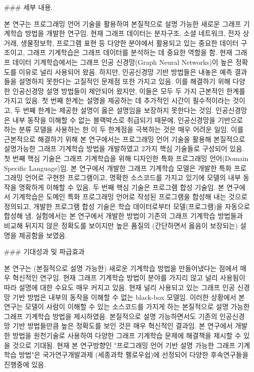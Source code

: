 



### 세부 내용.

본 연구는 프로그래밍 언어 기술을 활용하여 본질적으로 설명 가능한 새로운 그래프 기계학습 방법을 개발한 연구임. 
현재 그래프 데이터는 분자구조, 소셜 네트워크, 전자 상거래, 생물정보학, 
프로그램 표현 등 다양한 분야에서 활용되고 있는 중요한 데이터 구조이고, 그래프 기계학습은 그래프 데이터를 분석하는 데 중요한 역할을 함.
현재 그래프 데이터 기계학습에서는 그래프 인공 신경망(Graph Neural Networks)이 높은 정확도를 이유로 널리 사용되어 왔음. 
하지만, 인공신경망 기반 방법들은 내놓은 예측 결과들을 설명하지 못한다는 고질적인 문제점 또한 가지고 있음.
이를 해결하기 위해 다양한 인공신경망 설명 방법들이 제안되어 왔지만, 이들은 모두 두 가지 근본적인 한계를 가지고 있음.
첫 번째 한계는 설명을 제공하는 데 추가적인 시간이 필수적이라는 것이고, 두 번째 한계는 제공한 설명이 옳은 설명임을 보장하지 못한다는 것임. 
인공신경망은 내부 동작을 이해할 수 없는 블랙박스로 취급되기 때문에, 인공신경망을 기반으로 하는 분류 모델을 사용하는 한 이 두 한계점을 극복하는 것은 매우 어려운 일임.
이를 근본적으로 해결하기 위해 본 연구에서는 프로그래밍 언어 기술을 활용해 본질적으로 설명가능한 그래프 기계학습 방법을 개발하였고 2가지 핵심 기술들로 구성되어 있음.
첫 번째 핵심 기술은 그래프 기계학습을 위해 디자인한 특화 프로그래밍 언어(Domain Specific Language)임. 본 연구에서 개발한 그래프 기계학습 모델은 개발한 특화 프로그래밍 언어로 구현한 프로그램이고, 명확한 소스코드를 가지고 있기에 모델의 내부 동작을 명확하게 이해할 수 있음. 
두 번째 핵심 기술은 프로그램 합성 기술임.
본 연구에서 기계학습은 도메인 특화 프로그래밍 언어로 작성된 프로그램을 합성해 내는 것으로 정의되고, 개발한 프로그램 합성 기술은 학습 데이터로부터 모델(프로그램)을 자동으로 합성해 냄.
실험에서는 본 연구에서 개발한 방법이 기존의 그래프 기계학습 방법들과 비교해 뒤지지 않은 정확도를 보이지만 높은 품질의 (간단하면서 옳음이 보장되는) 설명을 제공함을 보였음.




### 기대성과 및 파급효과

본 연구는 (본질적으로 설명 가능한) 새로운 기계학습 방법을 만들어냈다는 점에서 매우 혁신적인 연구임.
현재 그래프 기계학습 방법이 분야를 가지리 않고 널리 사용됨이 따라 설명에 대한 수요도 매우 커지고 있음.
현재 널리 사용되고 있는 그래프 인공 신경망 기반 방법은 내부의 동작을 이해할 수 없는 black-box 모델임.
이러한 상황에서 본 연구는 모델이 사람이 이해할 수 있는 소스코드를 가지게 하는 본질적으로 설명 가능한 그래프 기계학습 방법을 제시하였음.
본질적으로 설명 가능하면서도 기존의 인공신경망 기반 방법들만큼 높은 정확도를 보인 것은 매우 혁신적인 결과임.
본 연구에서 개발한 방법을 원천기술로 사용하여 다양한 그래프 기계학습 문제에 해결책을 제시할 수 있을 것으로 기대됨.
현재 본 연구방향인 "프로그래밍 언어 기반 설명 가능한 그래프 기계학습 방법"은 국가연구개발과제 (세종과학 펠로우쉽)에 선정되어 다양한 후속연구들을 진행중에 있음.





